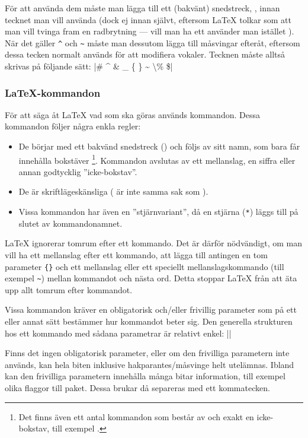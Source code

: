 \documentclass[lang=sv,ptsize=10pt,font=none,nomath,titles=bf,../../a4.tex]{subfiles}
\begin{document}
För att använda dem måste man lägga till ett (bakvänt) snedstreck,
\cmd{}, innan tecknet man vill använda (dock ej innan
\cmd{} självt, eftersom \LaTeX{} tolkar
\cmd{\textbackslash} som att man vill tvinga fram en
radbrytning — vill man ha ett \cmd{} använder man istället
).
När det gäller \verb|^| och \verb|~| måste man
dessutom lägga till måsvingar efteråt, eftersom dessa tecken normalt används för att
modifiera vokaler. Tecknen måste alltså skrivas på följande sätt:
\latex|\# \^{} \& \_ \{ \} \~{} \textbackslash \% \$|

\subsubsection{\LaTeX-kommandon}
För att säga åt \LaTeX{} vad som ska göras används kommandon. Dessa
kommandon följer några enkla regler:
\begin{itemize}
	\item De börjar med ett bakvänd snedstreck (\cmd{}) och följs av sitt
	namn, som bara får innehålla bokstäver%
	\footnote{Det finns även ett antal kommandon som består av \cmd{} och
	exakt en icke-bokstav, till exempel \cmd{\&}.}.
	Kommandon avslutas av ett
	mellanslag, en siffra eller annan godtycklig ”icke-bokstav”.
	
	\item De är skriftlägeskänsliga ( är inte samma sak som
	).
	
	\item Vissa kommandon har även en ”stjärnvariant”, då en stjärna
	(\texttt{*}) läggs till på slutet av kommandonamnet.
\end{itemize}

\LaTeX{} ignorerar tomrum efter ett kommando. Det är därför nödvändigt, om
man vill ha ett mellanslag efter ett kommando, att lägga till antingen en
tom parameter \texttt{\{\}} och ett mellanslag eller ett speciellt
mellanslagskommando (till exempel \texttt{\~{}}) mellan
kommandot och nästa ord. Detta stoppar \LaTeX{} från att äta upp allt
tomrum efter kommandot.

Vissa kommandon kräver en obligatorisk och/eller frivillig parameter som
på ett eller annat sätt bestämmer hur kommandot beter sig. Den generella
strukturen hos ett kommando med sådana parametrar är relativt enkel:
\latex||

Finns det ingen obligatorisk parameter, eller om den frivilliga parametern
inte används, kan hela biten inklusive hakparantes/måsvinge helt
utelämnas. Ibland kan den frivilliga parametern innehålla många bitar
information, till exempel olika flaggor till paket. Dessa brukar då
separeras med ett kommatecken.
\end{document}
